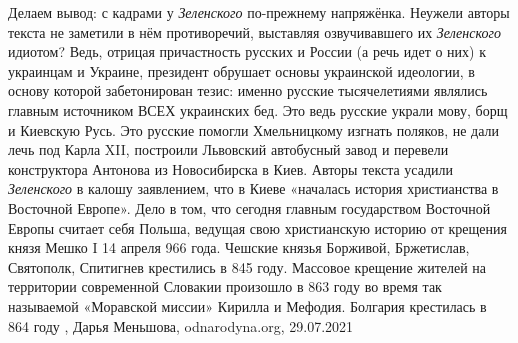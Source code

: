 Делаем вывод: с кадрами у \emph{Зеленского} по-прежнему напряжёнка. Неужели
авторы текста не заметили в нём противоречий, выставляя озвучивавшего их
\emph{Зеленского} идиотом? Ведь, отрицая причастность русских и России (а речь
идет о них) к украинцам и Украине, президент обрушает основы украинской
идеологии, в основу которой забетонирован тезис: именно русские тысячелетиями
являлись главным источником ВСЕХ украинских бед. Это ведь русские украли мову,
борщ и Киевскую Русь. Это русские помогли Хмельницкому изгнать поляков, не дали
лечь под Карла XII, построили Львовский автобусный завод и перевели
конструктора Антонова из Новосибирска в Киев.  Авторы текста усадили
\emph{Зеленского} в калошу заявлением, что в Киеве «началась история
христианства в Восточной Европе». Дело в том, что сегодня главным государством
Восточной Европы считает себя Польша, ведущая свою христианскую историю от
крещения князя Мешко I 14 апреля 966 года. Чешские князья Борживой, Бржетислав,
Святополк, Спитигнев крестились в 845 году. Массовое крещение жителей на
территории современной Словакии произошло в 863 году во время так называемой
«Моравской миссии» Кирилла и Мефодия. Болгария крестилась в 864 году
, 
Дарья Меньшова, odnarodyna.org, 29.07.2021
